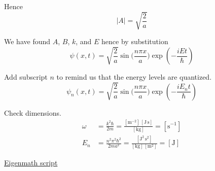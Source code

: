 Hence
\begin{equation*}
|A|=\sqrt{\frac{2}{a}}
\end{equation*}

We have found $A$, $B$, $k$, and $E$ hence by substitution
\begin{equation*}
\psi(x,t)=\sqrt{\frac{2}{a}}\sin\biggl(\frac{n\pi x}{a}\biggr)
\exp\left(-\frac{iEt}{\hbar}\right)
\end{equation*}

Add subscript $n$ to remind us that the energy levels are quantized.
\begin{equation*}
\psi_n(x,t)=\sqrt{\frac{2}{a}}\sin\biggl(\frac{n\pi x}{a}\biggr)
\exp\left(-\frac{iE_nt}{\hbar}\right)
\end{equation*}

Check dimensions.
\begin{align*}
\omega&=\frac{k^2\hbar}{2m}
=\frac{[\text{m}^{-2}]\,[\text{J}\,\text{s}]}{[\text{kg}]}=[\text{s}^{-1}]
\\[1ex]
E_n&=\frac{n^2\pi^2\hbar^2}{2ma^2}
=\frac{[\text{J}^2\,\text{s}^2]}{[\text{kg}]\,[\text{m}^2]}=[\text{J}]
\end{align*}

\href{https://georgeweigt.github.io/examples/particle-in-a-box-demo.html}{Eigenmath script}


